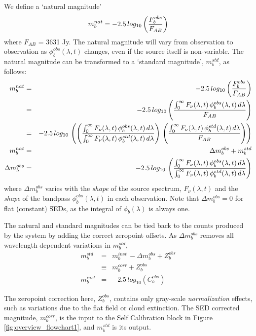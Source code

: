 \documentclass[12pt,preprint]{aastex}
\begin{document}
We define a `natural magnitude' 
\begin{equation}
\label{eqn:natmag}
m_b^{nat}  = -2.5\, log_{10} \left( {F_b^{obs} \over F_{AB}}  \right)
\end{equation}
where $F_{AB}$ = 3631 Jy. The natural magnitude will
vary from observation to observation as $\phi_b^{obs}(\lambda,t)$
changes, even if the source itself is non-variable. The natural
magnitude can be transformed to a `standard magnitude', $m_b^{std}$, as
follows:
\begin{eqnarray}
m_b^{nat} & = &-2.5\, log_{10} \left( {F_b^{obs} \over F_{AB}} \right) \\
& = & -2.5 \, log_{10} \left( { \int_0^\infty {F_\nu(\lambda,t) \,
    \phi_b^{obs}(\lambda,t) \, d\lambda} \over F_{AB} }  \right) \\
& = & -2.5 \, log_{10} \, \left( \left( { \int_0^\infty {F_\nu(\lambda,t) \,
    \phi_b^{obs}(\lambda,t) \, d\lambda} \over \int_0^\infty {F_\nu(\lambda,t) \,
    \phi_b^{std}(\lambda,t) \, d\lambda}} \right) \, \left( {\int_0^\infty {F_\nu(\lambda,t) \,
    \phi_b^{std}(\lambda,t) \, d\lambda} \over F_{AB}} \right) \right) \\
m_b^{nat} & = & \Delta m_b^{obs} + m_b^{std} \\
\label{eqn:Delta_m}
\Delta m_b^{obs} & = & -2.5 \, log_{10} \,  \left( { \int_0^\infty {F_\nu(\lambda,t) \,
    \phi_b^{obs}(\lambda,t) \, d\lambda} \over \int_0^\infty {F_\nu(\lambda,t) \,
    \phi_b^{std}(\lambda,t) \, d\lambda}} \right)
\end{eqnarray}
where $\Delta m_b^{obs}$ varies with the {\it shape} of the source
spectrum, $F_\nu(\lambda,t)$ and the {\it shape} of the bandpass
$\phi_b^{obs}(\lambda,t)$ in each observation. Note that $\Delta
m_b^{obs}=0$ for flat (constant) SEDs, as the integral of
$\phi_b(\lambda)$ is always one.  

The natural and standard magnitudes can be tied back to the counts
produced by the system by adding the correct zeropoint offsets. As
$\Delta m_b^{obs}$ removes all wavelength dependent variations in $m_b^{std}$,
\begin{eqnarray}
\label{eqn:mag2counts}
m_b^{std} & = & m_b^{inst} \, - \Delta m_b^{obs} + Z_b^{obs} \\
 & \equiv & m_b^{corr} + Z_b^{obs} \\
 m_b^{inst} & = & -2.5\,log_{10}(C_b^{obs})
\end{eqnarray}


The zeropoint correction here, $Z_b^{obs}$, contains only gray-scale
{\it normalization} effects, such as variations due to the flat field
or cloud extinction.  The SED corrected magnitude, $m_b^{corr}$, is the input to the Self Calibration block in 
Figure \ref{fig:overview_flowchart1}, and $m_b^{std}$ is its output.
\end{document}
